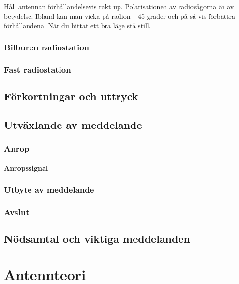 \documentclass[12ypt,swedish,a4paper]{report}
\begin{document}
Håll antennan förhållandelsevis rakt up. Polarisationen av radiovågorna är av betydelse. Ibland kan man vicka på radion $\pm$45 grader och på så vis förbättra förhållandena. När du hittat ett bra läge stå still. 

\subsection{Bilburen radiostation}


\subsection{Fast radiostation}


\section{Förkortningar och uttryck}

\section{Utväxlande av meddelande}

\subsection{Anrop}

\subsubsection{Anropssignal}

\subsection{Utbyte av meddelande}

\subsection{Avslut}

\section{Nödsamtal och viktiga meddelanden}

\chapter{Antennteori}
\end{document}
